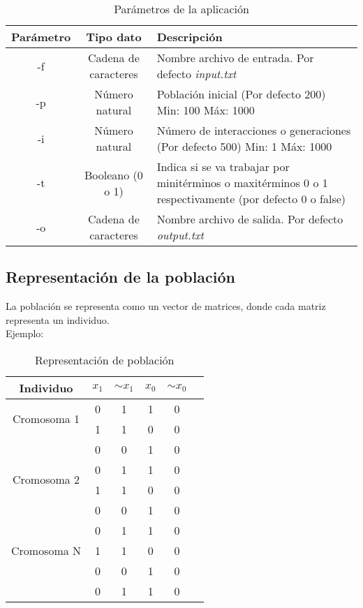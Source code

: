\documentclass[a4paper]{article}
\begin{document}
\begin{table}[H]
	\centering
	\caption{Parámetros de la aplicación}
	\begin{tabular}{|c|c|p{5cm}|}
		\hline
		\textbf{Parámetro} & \textbf{Tipo dato} & \textbf{Descripción}\\
		\hline
		-f & Cadena de caracteres & Nombre archivo de entrada. Por defecto \textit{input.txt}\\
		\hline
		-p & Número natural & Población inicial (Por defecto 200) Min: 100 Máx: 1000\\
		\hline
		-i & Número natural & Número de interacciones o generaciones (Por defecto 500) Min: 1 Máx: 1000\\
		\hline
		-t & Booleano (0 o 1) & Indica si se va trabajar por minitérminos o maxitérminos 0 o 1 respectivamente (por defecto 0 o false)\\
		\hline
		-o & Cadena de caracteres & Nombre archivo de salida. Por defecto \textit{output.txt} \\
		\hline
	\end{tabular}
\end{table}

\subsection{Representación de la población}

La población se representa como un vector de matrices, donde cada matriz representa un individuo.\\
Ejemplo:
\begin{table}[H]
	\centering
	\caption{Representación de población}
	\begin{tabular}{| c |c | c | c|  c|  c|}
		\hline
		Individuo & $x_1$ & $ \sim{x_1}$ & $x_0$ & $ \sim{x_0}$\\
		\hline
		\multirow{2}{4cm}{Cromosoma 1} &0 & 1& 1 & 0\\
		\cline{2-5}
		& 1 & 1& 0 & 0\\
		\cline{2-5}
		& 0 & 0& 1 & 0\\
		\hline
		\hline
		\multirow{2}{4cm}{Cromosoma 2}  & 0 & 1& 1 & 0\\
		\cline{2-5}
		& 1 & 1& 0 & 0\\
		\cline{2-5}
		& 0 & 0& 1 & 0\\
		\hline
		\hline
		\multirow{3}{4cm}{Cromosoma N}  & 0 & 1& 1 & 0\\
		\cline{2-5}
		& 1 & 1& 0 & 0\\
		\cline{2-5}
		& 0 & 0& 1 & 0\\
		\cline{2-5}
		& 0 & 1& 1 & 0\\
		\hline
	\end{tabular}
\end{table}
\end{document}
